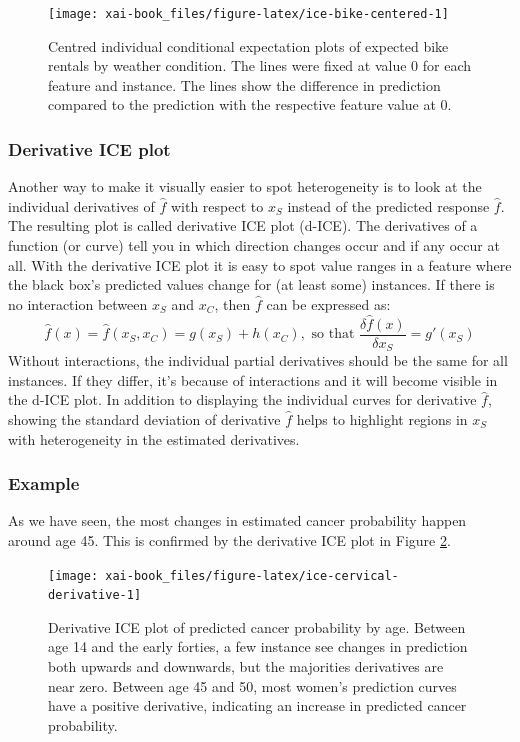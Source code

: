 \documentclass[12pt,]{krantz}
\theoremstyle{definition}
\theoremstyle{definition}
\theoremstyle{definition}
\theoremstyle{remark}
\begin{document}
\begin{figure}

{\centering \texttt{[image: xai-book\_files/figure-latex/ice-bike-centered-1]} 

}

\caption{Centred individual conditional expectation plots of expected bike rentals by weather condition. The lines were fixed at value 0 for each feature and instance. The lines show the difference in prediction compared to the prediction with the respective feature value at 0.}\label{fig:ice-bike-centered}
\end{figure}

\subsubsection{Derivative ICE plot}\label{derivative-ice-plot}

Another way to make it visually easier to spot heterogeneity is to look
at the individual derivatives of \(\hat{f}\) with respect to \(x_S\)
instead of the predicted response \(\hat{f}\). The resulting plot is
called derivative ICE plot (d-ICE). The derivatives of a function (or
curve) tell you in which direction changes occur and if any occur at
all. With the derivative ICE plot it is easy to spot value ranges in a
feature where the black box's predicted values change for (at least
some) instances. If there is no interaction between \(x_S\) and \(x_C\),
then \(\hat{f}\) can be expressed as:
\[\hat{f}(x) = \hat{f}(x_S, x_C) = g(x_S) + h(x_C), \text{ so that } \frac{\delta\hat{f}(x)}{\delta x_S} = g'(x_S)\]
Without interactions, the individual partial derivatives should be the
same for all instances. If they differ, it's because of interactions and
it will become visible in the d-ICE plot. In addition to displaying the
individual curves for derivative \(\hat{f}\), showing the standard
deviation of derivative \(\hat{f}\) helps to highlight regions in
\(x_S\) with heterogeneity in the estimated derivatives.

\subsubsection{Example}\label{example-3}

As we have seen, the most changes in estimated cancer probability happen
around age 45. This is confirmed by the derivative ICE plot in Figure
\ref{fig:ice-cervical-derivative}.

\begin{figure}

{\centering \texttt{[image: xai-book\_files/figure-latex/ice-cervical-derivative-1]} 

}

\caption{Derivative ICE plot of predicted cancer probability by age. Between age 14 and the early forties, a few instance see changes in prediction both upwards and downwards, but the majorities derivatives are near zero. Between age 45 and 50, most women's prediction curves have a positive derivative, indicating an increase in predicted cancer probability.}\label{fig:ice-cervical-derivative}
\end{figure}
\end{document}
